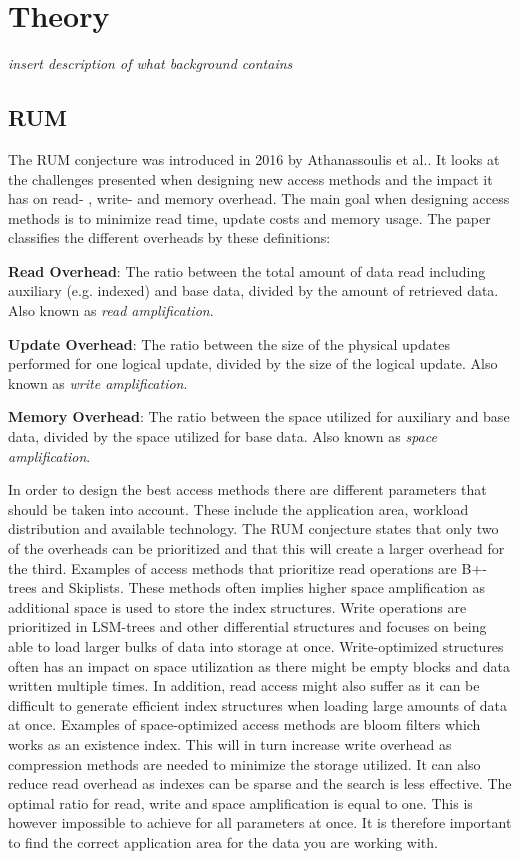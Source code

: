 \chapter{Theory}
\label{chap:background}

\emph{insert description of what background contains}

\section{RUM}
The RUM conjecture was introduced in 2016 by Athanassoulis et al.\cite{RUM}. It looks at the challenges presented when designing new access methods and the impact it has on read- , write- and memory overhead. The main goal when designing access methods is to minimize read time, update costs and memory usage. The paper classifies the different overheads by these definitions: \newline

\textbf{Read Overhead}: The ratio between the total amount of data read including auxiliary (e.g. indexed) and base data, divided by the amount of retrieved data. Also known as \emph{read amplification}.\newline

\textbf{Update Overhead}: The ratio between the size of the physical updates performed for one logical update, divided by the size of the logical update. Also known as \emph{write amplification}.\newline

\textbf{Memory Overhead}: The ratio between the space utilized for auxiliary and base data, divided by the space utilized for base data. Also known as \emph{space amplification}. \newline

In order to design the best access methods there are different parameters that should be taken into account. These include the application area, workload distribution and available technology. The RUM conjecture states that only two of the overheads can be prioritized and that this will create a larger overhead for the third. Examples of access methods that prioritize read operations are B+-trees and Skiplists. These methods often implies higher space amplification as additional space is used to store the index structures. Write operations are prioritized in LSM-trees and other differential structures and focuses on being able to load larger bulks of data into storage at once. Write-optimized structures often has an impact on space utilization as there might be empty blocks and data written multiple times. In addition, read access might also suffer as it can be difficult to generate efficient index structures when loading large amounts of data at once. Examples of space-optimized access methods are bloom filters which works as an existence index. This will in turn increase write overhead as compression methods are needed to minimize the storage utilized. It can also reduce read overhead as indexes can be sparse and the search is less effective. The optimal ratio for read, write and space amplification is equal to one. This is however impossible to achieve for all parameters at once. It is therefore important to find the correct application area for the data you are working with.

